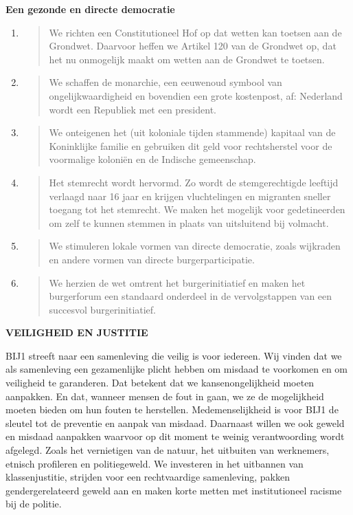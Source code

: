 \textbf{Een gezonde en directe democratie}

\begin{enumerate}
\def\labelenumi{\arabic{enumi}.}
\item
  \begin{quote}
  We richten een Constitutioneel Hof op dat wetten kan toetsen aan de
  Grondwet. Daarvoor heffen we Artikel 120 van de Grondwet op, dat het
  nu onmogelijk maakt om wetten aan de Grondwet te toetsen.
  \end{quote}
\item
  \begin{quote}
  We schaffen de monarchie, een eeuwenoud symbool van
  ongelijkwaardigheid en bovendien een grote kostenpost, af: Nederland
  wordt een Republiek met een president.
  \end{quote}
\item
  \begin{quote}
  We onteigenen het (uit koloniale tijden stammende) kapitaal van de
  Koninklijke familie en gebruiken dit geld voor rechtsherstel voor de
  voormalige koloniën en de Indische gemeenschap.
  \end{quote}
\item
  \begin{quote}
  Het stemrecht wordt hervormd. Zo wordt de stemgerechtigde leeftijd
  verlaagd naar 16 jaar en krijgen vluchtelingen en migranten sneller
  toegang tot het stemrecht. We maken het mogelijk voor gedetineerden om
  zelf te kunnen stemmen in plaats van uitsluitend bij volmacht.
  \end{quote}
\item
  \begin{quote}
  We stimuleren lokale vormen van directe democratie, zoals wijkraden en
  andere vormen van directe burgerparticipatie.
  \end{quote}
\item
  \begin{quote}
  We herzien de wet omtrent het burgerinitiatief en maken het
  burgerforum een standaard onderdeel in de vervolgstappen van een
  succesvol burgerinitiatief.
  \end{quote}
\end{enumerate}

\textbf{VEILIGHEID EN JUSTITIE}

BIJ1 streeft naar een samenleving die veilig is voor iedereen. Wij
vinden dat we als samenleving een gezamenlijke plicht hebben om misdaad
te voorkomen en om veiligheid te garanderen. Dat betekent dat we
kansenongelijkheid moeten aanpakken. En dat, wanneer mensen de fout in
gaan, we ze de mogelijkheid moeten bieden om hun fouten te herstellen.
Medemenselijkheid is voor BIJ1 de sleutel tot de preventie en aanpak van
misdaad. Daarnaast willen we ook geweld en misdaad aanpakken waarvoor op
dit moment te weinig verantwoording wordt afgelegd. Zoals het
vernietigen van de natuur, het uitbuiten van werknemers, etnisch
profileren en politiegeweld. We investeren in het uitbannen van
klassenjustitie, strijden voor een rechtvaardige samenleving, pakken
gendergerelateerd geweld aan en maken korte metten met institutioneel
racisme bij de politie.

